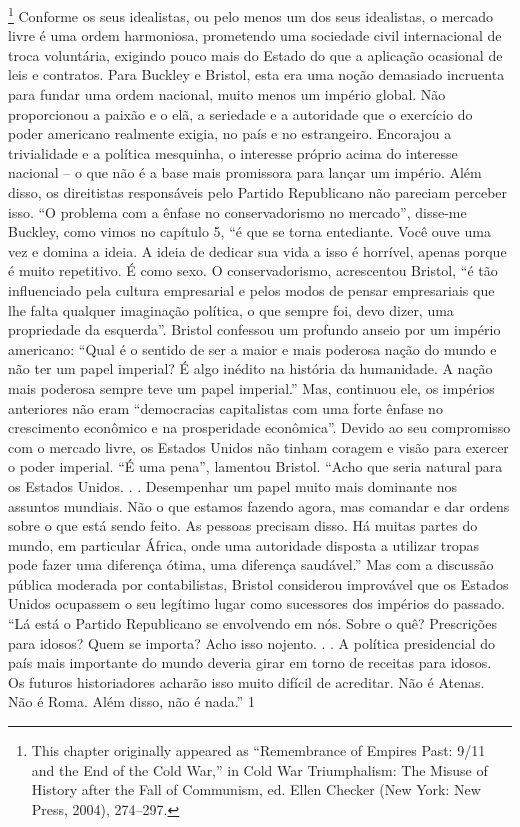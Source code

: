  \footnote{This chapter originally appeared as “Remembrance of Empires Past: 9/11 and the End of the Cold War,” in Cold War Triumphalism: The Misuse of History after the Fall of Communism, ed. Ellen Checker (New York: New Press, 2004), 274–297.}  
Conforme os seus idealistas, ou pelo menos um dos seus idealistas, o mercado livre é uma ordem harmoniosa, prometendo uma sociedade civil internacional de troca voluntária, exigindo pouco mais do Estado do que a aplicação ocasional de leis e contratos. Para Buckley e Bristol, esta era uma noção demasiado incruenta para fundar uma ordem nacional, muito menos um império global. Não proporcionou a paixão e o elã, a seriedade e a autoridade que o exercício do poder americano realmente exigia, no país e no estrangeiro. Encorajou a trivialidade e a política mesquinha, o interesse próprio acima do interesse nacional – o que não é a base mais promissora para lançar um império. Além disso, os direitistas responsáveis ​​pelo Partido Republicano não pareciam perceber isso. “O problema com a ênfase no conservadorismo no mercado”, disse-me Buckley, como vimos no capítulo 5, “é que se torna entediante. Você ouve uma vez e domina a ideia. A ideia de dedicar sua vida a isso é horrível, apenas porque é muito repetitivo. É como sexo. O conservadorismo, acrescentou Bristol, “é tão influenciado pela cultura empresarial e pelos modos de pensar empresariais que lhe falta qualquer imaginação política, o que sempre foi, devo dizer, uma propriedade da esquerda”. Bristol confessou um profundo anseio por um império americano: “Qual é o sentido de ser a maior e mais poderosa nação do mundo e não ter um papel imperial? É algo inédito na história da humanidade. A nação mais poderosa sempre teve um papel imperial.” Mas, continuou ele, os impérios anteriores não eram “democracias capitalistas com uma forte ênfase no crescimento econômico e na prosperidade econômica”. Devido ao seu compromisso com o mercado livre, os Estados Unidos não tinham coragem e visão para exercer o poder imperial. “É uma pena”, lamentou Bristol. “Acho que seria natural para os Estados Unidos. . . Desempenhar um papel muito mais dominante nos assuntos mundiais. Não o que estamos fazendo agora, mas comandar e dar ordens sobre o que está sendo feito. As pessoas precisam disso. Há muitas partes do mundo, em particular África, onde uma autoridade disposta a utilizar tropas pode fazer uma diferença ótima, uma diferença saudável.” Mas com a discussão pública moderada por contabilistas, Bristol considerou improvável que os Estados Unidos ocupassem o seu legítimo lugar como sucessores dos impérios do passado. “Lá está o Partido Republicano se envolvendo em nós. Sobre o quê? Prescrições para idosos? Quem se importa? Acho isso nojento. . . A política presidencial do país mais importante do mundo deveria girar em torno de receitas para idosos. Os futuros historiadores acharão isso muito difícil de acreditar. Não é Atenas. Não é Roma. Além disso, não é nada.”
 {\color{blue} 1}  

